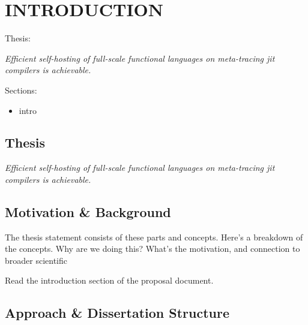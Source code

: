 \chapter[\texorpdfstring{INTRODUCTION}
                          {1. Introduction}]{INTRODUCTION}
    \label{chapter:introduction}

    \begin{chaptersynopsis}

       Thesis:

        \textit{Efficient self-hosting of full-scale functional languages on meta-tracing \gls{jit} compilers is achievable.}

        \vspace{2em}

        Sections:
		\begin{itemize}
			\item intro
		\end{itemize}
    \end{chaptersynopsis}

    \section{Thesis}

    \textit{Efficient self-hosting of full-scale functional languages on meta-tracing \gls{jit} compilers is achievable.}


    \section[\texorpdfstring{Motivation \& Background}{Context}]{Motivation \& Background}

        \begin{mainpoint}

            The thesis statement consists of these parts and concepts. Here's a breakdown of the concepts.
            Why are we doing this? What's the motivation, and connection to broader scientific

            \begin{todo}
                Read the introduction section of the proposal document.
            \end{todo}

        \end{mainpoint}

    \section[\texorpdfstring{Approach \& Dissertation Structure}{Dissertation Structure}]{Approach \& Dissertation Structure}

